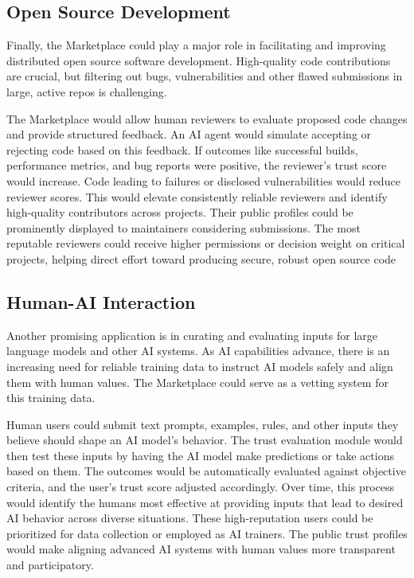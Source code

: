 \documentclass{article}
\begin{document}
\subsection{Open Source Development}
 Finally, the Marketplace could play a major role in facilitating and improving distributed open source software development. High-quality code contributions are crucial, but filtering out bugs, vulnerabilities and other flawed submissions in large, active repos is challenging. 

The Marketplace would allow human reviewers to evaluate proposed code changes and provide structured feedback. An AI agent would simulate accepting or rejecting code based on this feedback. If outcomes like successful builds, performance metrics, and bug reports were positive, the reviewer's trust score would increase. Code leading to failures or disclosed vulnerabilities would reduce reviewer scores. This would elevate consistently reliable reviewers and identify high-quality contributors across projects. Their public profiles could be prominently displayed to maintainers considering submissions. The most reputable reviewers could receive higher permissions or decision weight on critical projects, helping direct effort toward producing secure, robust open source code

\subsection{Human-AI Interaction}
Another promising application is in curating and evaluating inputs for large language models and other AI systems. As AI capabilities advance, there is an increasing need for reliable training data to instruct AI models safely and align them with human values. The Marketplace could serve as a vetting system for this training data.

Human users could submit text prompts, examples, rules, and other inputs they believe should shape an AI model's behavior. The trust evaluation module would then test these inputs by having the AI model make predictions or take actions based on them. The outcomes would be automatically evaluated against objective criteria, and the user's trust score adjusted accordingly. Over time, this process would identify the humans most effective at providing inputs that lead to desired AI behavior across diverse situations. These high-reputation users could be prioritized for data collection or employed as AI trainers. The public trust profiles would make aligning advanced AI systems with human values more transparent and participatory.
\end{document}
